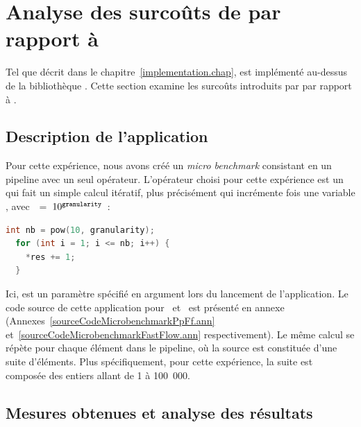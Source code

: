 


\section{Analyse des surco\^uts de  par rapport \`a }
\label{coutsPpFf.sect}



Tel que d\'ecrit dans le chapitre~\ref{implementation.chap},  est impl\'ement\'e au-dessus de la biblioth\`eque . Cette section examine les surco\^uts introduits par  par rapport \`a . 

\subsection{Description de l'application}

Pour cette exp\'erience, nous avons cr\'e\'e un \emph{micro benchmark} consistant en un {pipeline} avec un seul op\'erateur. L'op\'erateur choisi pour cette exp\'erience est un  qui fait un simple calcul it\'eratif, plus pr\'ecis\'ement qui incr\'emente   fois une variable , avec~~=~$10^{{\tt granularity}}$~:
{
\begin{lstlisting}[language=c++]
  int nb = pow(10, granularity);
  for (int i = 1; i <= nb; i++) {
    *res += 1;   
  }
\end{lstlisting}
} 

Ici,  est un param\`etre sp\'ecifi\'e en argument lors du lancement de l'application. Le code source de cette application pour~ et~ est pr\'esent\'e en annexe (Annexes~\ref{sourceCodeMicrobenchmarkPpFf.ann} et~\ref{sourceCodeMicrobenchmarkFastFlow.ann} respectivement). Le m\^eme calcul se r\'ep\`ete pour chaque \'el\'ement dans le pipeline, o\`u la source est constitu\'ee d'une suite d'\'el\'ements. Plus sp\'ecifiquement, pour cette exp\'erience, la suite est compos\'ee des entiers allant de 1 \`a 100~000.  


\subsection{Mesures obtenues et analyse des r\'esultats}

